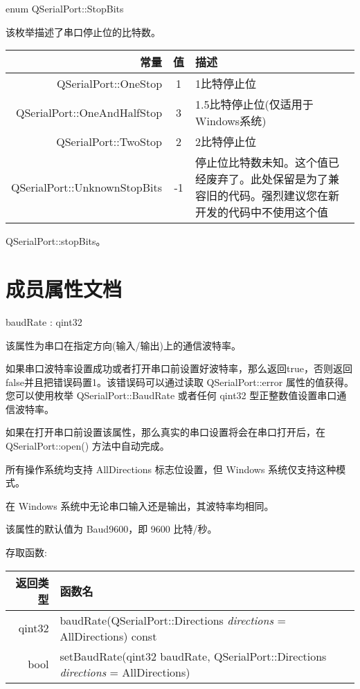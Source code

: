 enum QSerialPort::StopBits

该枚举描述了串口停止位的比特数。

\begin{tabular}{|r|c|m{15em}|}
	\hline
	常量	&值&	描述 \\ 
	\hline 
	QSerialPort::OneStop 	&1& 	1比特停止位 \\ 
	\hline
	QSerialPort::OneAndHalfStop &	3 &	1.5比特停止位(仅适用于Windows系统) \\ 
	\hline
	QSerialPort::TwoStop &	2 	&2比特停止位 \\ 
	\hline
	QSerialPort::UnknownStopBits &	-1& 	停止位比特数未知。这个值已经废弃了。此处保留是为了兼容旧的代码。强烈建议您在新开发的代码中不使用这个值 \\ 
   \hline
\end{tabular}

\begin{seeAlso}
QSerialPort::stopBits。
\end{seeAlso}

\section{成员属性文档}


baudRate : qint32

该属性为串口在指定方向(输入/输出)上的通信波特率。

如果串口波特率设置成功或者打开串口前设置好波特率，那么返回true，否则返回false并且把错误码置1。该错误码可以通过读取 QSerialPort::error 属性的值获得。您可以使用枚举 QSerialPort::BaudRate 或者任何 qint32 型正整数值设置串口通信波特率。

\begin{notice}
如果在打开串口前设置该属性，那么真实的串口设置将会在串口打开后，在 QSerialPort::open() 方法中自动完成。
\end{notice}

\begin{warning}
所有操作系统均支持 AllDirections 标志位设置，但 Windows 系统仅支持这种模式。
\end{warning}

\begin{warning}
在 Windows 系统中无论串口输入还是输出，其波特率均相同。
\end{warning}

该属性的默认值为 Baud9600，即 9600 比特/秒。

存取函数:

\begin{tabular}{|r|m{25em}|}
\hline
返回类型 &	函数名 \\ 
\hline
qint32 	&baudRate(QSerialPort::Directions \emph{directions} = AllDirections) const \\ 
\hline
bool 	&setBaudRate(qint32 baudRate, QSerialPort::Directions \emph{directions} = AllDirections) \\ 
\hline
\end{tabular} 

